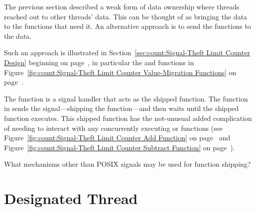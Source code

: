 The previous section described a weak form of data ownership where
threads reached out to other threads' data.
This can be thought of as bringing the data to the functions that
need it.
An alternative approach is to send the functions to the data.

Such an approach is illustrated in
Section~\ref{sec:count:Signal-Theft Limit Counter Design}
beginning on
page~\pageref{sec:count:Signal-Theft Limit Counter Design},
in particular the  and
 functions in
Figure~\ref{fig:count:Signal-Theft Limit Counter Value-Migration Functions}
on
page~\pageref{fig:count:Signal-Theft Limit Counter Value-Migration Functions}.

The  function is a signal handler that
acts as the shipped function.
The  function in 
sends the signal---shipping the function---and then waits until
the shipped function executes.
This shipped function has the not-unusual added complication of
needing to interact with any concurrently executing 
or  functions (see
Figure~\ref{fig:count:Signal-Theft Limit Counter Add Function}
on
page~\pageref{fig:count:Signal-Theft Limit Counter Add Function} and
Figure~\ref{fig:count:Signal-Theft Limit Counter Subtract Function}
on
page~\pageref{fig:count:Signal-Theft Limit Counter Subtract Function}).

\QuickQuiz{}
	What mechanisms other than POSIX signals may be used for function
	shipping?
 \QuickQuizEnd

\section{Designated Thread}
\label{sec:owned:Designated Thread}

